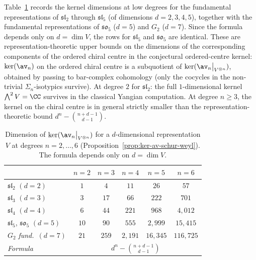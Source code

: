 \begin{remark}
\label{rem:ker-av-table}
Table~\ref{tab:ker-av-dims} records the kernel dimensions
at low degrees for the fundamental representations of
$\mathfrak{sl}_2$ through $\mathfrak{sl}_5$ (of dimensions
$d = 2, 3, 4, 5$), together with the fundamental
representations of $\mathfrak{so}_5$ ($d = 5$) and
$G_2$ ($d = 7$). Since the formula depends only on
$d = \dim V$, the rows for $\mathfrak{sl}_5$ and
$\mathfrak{so}_5$ are identical.
These are representation-theoretic upper bounds on the
dimensions of the corresponding components of the ordered
chiral centre in the conjectural ordered-centre kernel:
$\ker(\av_n)$ on the ordered chiral centre is a subquotient
of $\ker(\av_n\big|_{V^{\otimes n}})$, obtained by passing
to bar-complex cohomology
(only the cocycles in the non-trivial $\Sigma_n$-isotypics
survive). At degree $2$ for $\mathfrak{sl}_2$: the full
$1$-dimensional kernel $\bigwedge^2 V = \CC$ survives in
the classical Yangian computation.
At degree $n \geq 3$, the kernel on the chiral centre is
in general strictly smaller than the
representation-theoretic bound $d^n - \binom{n+d-1}{d-1}$.

\begin{table}[h]
\centering
\renewcommand{\arraystretch}{1.3}
\begin{tabular}{@{} l c c c c c @{}}
\toprule
 & $n = 2$ & $n = 3$ & $n = 4$ & $n = 5$ & $n = 6$ \\
\midrule
$\mathfrak{sl}_2$ $(d{=}2)$
 & $1$ & $4$ & $11$ & $26$ & $57$ \\
$\mathfrak{sl}_3$ $(d{=}3)$
 & $3$ & $17$ & $66$ & $222$ & $701$ \\
$\mathfrak{sl}_4$ $(d{=}4)$
 & $6$ & $44$ & $221$ & $968$ & $4{,}012$ \\
$\mathfrak{sl}_5$, $\mathfrak{so}_5$ $(d{=}5)$
 & $10$ & $90$ & $555$ & $2{,}999$ & $15{,}415$ \\
$G_2$ \textit{fund.}\ $(d{=}7)$
 & $21$ & $259$ & $2{,}191$ & $16{,}345$ & $116{,}725$ \\
\midrule
\textit{Formula}
 & \multicolumn{5}{c}{$d^n - \binom{n+d-1}{d-1}$} \\
\bottomrule
\end{tabular}
\caption{Dimension of $\ker(\av_n\big|_{V^{\otimes n}})$
for a $d$-dimensional representation $V$ at degrees
$n = 2, \ldots, 6$
\textup{(Proposition~\ref{prop:ker-av-schur-weyl})}.
The formula depends only on $d = \dim V$.}
\label{tab:ker-av-dims}
\end{table}
\end{remark}


